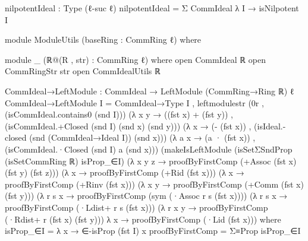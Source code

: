     nilpotentIdeal : Type (ℓ-suc ℓ)
    nilpotentIdeal = Σ CommIdeal λ I → isNilpotent I

  module ModuleUtils (baseRing : CommRing ℓ) where

    module _ (ℝ@(R , str) : CommRing ℓ)  where
      open CommIdeal ℝ
      open CommRingStr str
      open CommIdealUtils ℝ

      CommIdeal→LeftModule : CommIdeal → LeftModule (CommRing→Ring ℝ) ℓ
      CommIdeal→LeftModule I = CommIdeal→Type I , 
                                leftmodulestr 
                                  (0r , (isCommIdeal.contains0 (snd I))) 
                                  (λ x y → ((fst x) + (fst y)) , (isCommIdeal.+Closed (snd I) (snd x) (snd y))) 
                                  (λ x → (- (fst x)) , (isIdeal.-closed (snd (CommIdeal→Ideal I)) (snd x))) 
                                  (λ a x → (a · (fst x)) , (isCommIdeal.·Closed (snd I) a (snd x))) 
                                  (makeIsLeftModule 
                                    (isSetΣSndProp (isSetCommRing ℝ) isProp_∈I) 
                                    (λ x y z → proofByFirstComp (+Assoc (fst x) (fst y) (fst z))) 
                                    (λ x → proofByFirstComp (+Rid (fst x))) 
                                    (λ x → proofByFirstComp (+Rinv (fst x)))
                                    (λ x y → proofByFirstComp (+Comm (fst x) (fst y))) 
                                    (λ r s x → proofByFirstComp (sym (·Assoc r s (fst x)))) 
                                    (λ r s x → proofByFirstComp (·Ldist+ r s (fst x))) 
                                    (λ r x y → proofByFirstComp (·Rdist+ r (fst x) (fst y))) 
                                    λ x → proofByFirstComp (·Lid (fst x)))
        where
          isProp_∈I = λ x → ∈-isProp (fst I) x
          proofByFirstComp =  Σ≡Prop isProp_∈I
    

